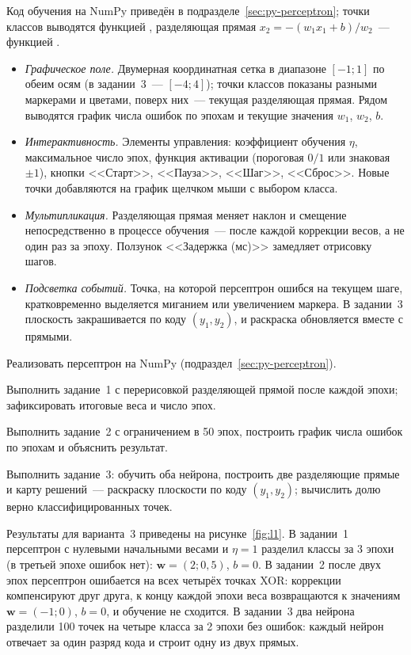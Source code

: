 Код обучения на NumPy приведён в подразделе~\ref{sec:py-perceptron}; точки классов выводятся функцией
, разделяющая прямая $x_2 = -(w_1x_1 + b)/w_2$~--- функцией .

\begin{itemize}
\item \emph{Графическое поле.} Двумерная координатная сетка в диапазоне $[-1; 1]$ по обеим осям (в задании~3~--- $[-4; 4]$); точки классов показаны разными маркерами и цветами, поверх них~--- текущая разделяющая прямая. Рядом выводятся график числа ошибок по эпохам и текущие значения $w_1$, $w_2$, $b$.
\item \emph{Интерактивность.} Элементы управления: коэффициент обучения $\eta$, максимальное число эпох, функция активации (пороговая $0/1$ или знаковая $\pm 1$), кнопки <<Старт>>, <<Пауза>>, <<Шаг>>, <<Сброс>>. Новые точки добавляются на график щелчком мыши с выбором класса.
\item \emph{Мультипликация.} Разделяющая прямая меняет наклон и смещение непосредственно в процессе обучения~--- после каждой коррекции весов, а не один раз за эпоху. Ползунок <<Задержка (мс)>> замедляет отрисовку шагов.
\item \emph{Подсветка событий.} Точка, на которой персептрон ошибся на текущем шаге, кратковременно выделяется миганием или увеличением маркера. В задании~3 плоскость закрашивается по коду $(y_1, y_2)$, и раскраска обновляется вместе с прямыми.
\end{itemize}

\begin{steps}
\item Реализовать персептрон на NumPy (подраздел~\ref{sec:py-perceptron}).
\item Выполнить задание~1 с перерисовкой разделяющей прямой после каждой эпохи; зафиксировать итоговые
веса и число эпох.
\item Выполнить задание~2 с ограничением в 50 эпох, построить график числа ошибок по эпохам и объяснить
результат.
\item Выполнить задание~3: обучить оба нейрона, построить две разделяющие прямые и карту решений~---
раскраску плоскости по коду $(y_1, y_2)$; вычислить долю верно классифицированных точек.
\end{steps}

Результаты для варианта~3 приведены на рисунке~\ref{fig:l1}. В задании~1 персептрон с нулевыми
начальными весами и $\eta = 1$ разделил классы за 3 эпохи (в третьей эпохе ошибок нет):
$\mathbf{w} = (2; 0,5)$, $b = 0$. В задании~2 после двух эпох персептрон ошибается на всех четырёх
точках XOR: коррекции компенсируют друг друга, к концу каждой эпохи веса возвращаются к значениям
$\mathbf{w} = (-1; 0)$, $b = 0$, и обучение не сходится.
В задании~3 два нейрона разделили 100 точек на четыре класса за 2 эпохи без ошибок: каждый нейрон
отвечает за один разряд кода и строит одну из двух прямых.

